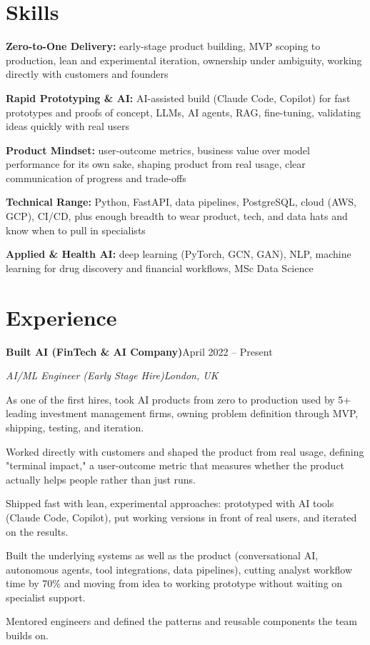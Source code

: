 \documentclass[10pt,a4paper]{article}
\newcommand{\entry}[4]{%
  {\color{company}\bfseries #1}\hfill {\color{muted}#2}\par
  \vspace{1pt}
  {\itshape #3}\hfill {\color{muted}\itshape #4}\par
  \vspace{3pt}%
}
\begin{document}
\section{Skills}
\begin{tight}
  \item[\textcolor{accent}{\small$\bullet$}] \textbf{Zero-to-One Delivery:} early-stage product building, MVP scoping to production, lean and experimental iteration, ownership under ambiguity, working directly with customers and founders
  \item[\textcolor{accent}{\small$\bullet$}] \textbf{Rapid Prototyping \& AI:} AI-assisted build (Claude Code, Copilot) for fast prototypes and proofs of concept, LLMs, AI agents, RAG, fine-tuning, validating ideas quickly with real users
  \item[\textcolor{accent}{\small$\bullet$}] \textbf{Product Mindset:} user-outcome metrics, business value over model performance for its own sake, shaping product from real usage, clear communication of progress and trade-offs
  \item[\textcolor{accent}{\small$\bullet$}] \textbf{Technical Range:} Python, FastAPI, data pipelines, PostgreSQL, cloud (AWS, GCP), CI/CD, plus enough breadth to wear product, tech, and data hats and know when to pull in specialists
  \item[\textcolor{accent}{\small$\bullet$}] \textbf{Applied \& Health AI:} deep learning (PyTorch, GCN, GAN), NLP, machine learning for drug discovery and financial workflows, MSc Data Science
\end{tight}

\section{Experience}
\entry{Built AI (FinTech \& AI Company)}{April 2022 -- Present}{AI/ML Engineer (Early Stage Hire)}{London, UK}
\begin{tight}
  \item As one of the first hires, took AI products from zero to production used by 5+ leading investment management firms, owning problem definition through MVP, shipping, testing, and iteration.
  \item Worked directly with customers and shaped the product from real usage, defining "terminal impact," a user-outcome metric that measures whether the product actually helps people rather than just runs.
  \item Shipped fast with lean, experimental approaches: prototyped with AI tools (Claude Code, Copilot), put working versions in front of real users, and iterated on the results.
  \item Built the underlying systems as well as the product (conversational AI, autonomous agents, tool integrations, data pipelines), cutting analyst workflow time by 70\% and moving from idea to working prototype without waiting on specialist support.
  \item Mentored engineers and defined the patterns and reusable components the team builds on.
\end{tight}
\end{document}
